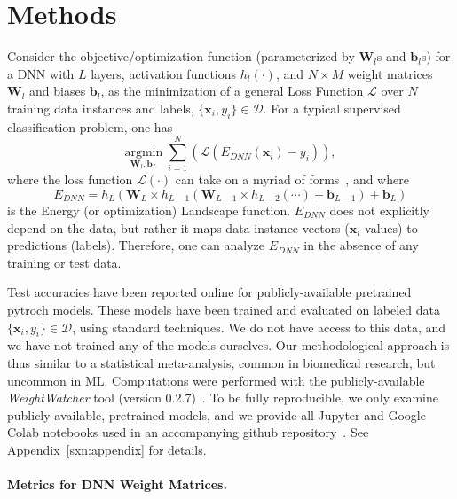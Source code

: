 \section{Methods}
\label{sxn:methods}


Consider the objective/optimization function (parameterized by $\mathbf{W}_{l}$s and $\mathbf{b}_{l}$s) for a DNN with $L$ layers, activation functions $h_{l}(\cdot)$, and $N\times M$ weight matrices $\mathbf{W}_{l}$ and biases $\mathbf{b}_{l}$, as 
the minimization of a general Loss Function $\mathcal{L}$ over $N$ training data instances and labels, $\{\mathbf{x}_{i},y_{i}\}\in\mathcal{D}$.
For a typical supervised classification problem, one has
\begin{equation}
\underset{\mathbf{W}_{l},\mathbf{b}_{L}}{\text{argmin}}\;\sum_{i=1}^{N}\left(\mathcal{L}(E_{DNN}(\mathbf{x}_{i})-y_{i})\right)  ,
\end{equation}
where the loss function $\mathcal{L}(\cdot)$ can take on a myriad of forms~\cite{JC17_TR}, and where
\begin{equation}
E_{DNN}=h_{L}(\mathbf{W}_{L}\times h_{L-1}(\mathbf{W}_{L-1}\times h_{L-2}(\cdots)+\mathbf{b}_{L-1})+\mathbf{b}_{L})
\label{eqn:dnn_energy}
\end{equation}
is the Energy (or optimization) Landscape function.  
$E_{DNN}$ does not explicitly depend on the data, but rather it maps data instance vectors ($\mathbf{x}_i$ values) to predictions (labels).
Therefore, one can analyze $E_{DNN}$ in the absence of any training or test data. 

Test accuracies have been reported online for publicly-available pretrained pytroch models.
These models have been trained and evaluated on labeled data $\{\mathbf{x}_{i},y_{i}\}\in\mathcal{D}$, using standard techniques.  
We do not have access to this data, and we have not trained any of the models ourselves. 
Our methodological approach is thus similar to a statistical meta-analysis, common in biomedical research, but uncommon in ML.
%
Computations were performed with the publicly-available \emph{WeightWatcher} tool (version 0.2.7)~\cite{weightwatcher_package}.
To be fully reproducible, we only examine publicly-available, pretrained models, and we provide all Jupyter and Google Colab notebooks used in an accompanying github repository~\cite{kdd20_sub_repo}.
See Appendix~\ref{sxn:appendix} for details.


\paragraph{Metrics for DNN Weight Matrices.}

